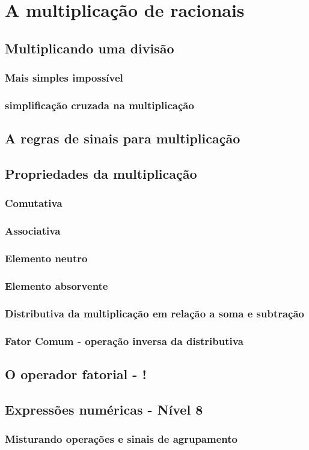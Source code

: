 \chapter[A multiplicação de racionais]{A multiplicação de racionais}

\section{Multiplicando uma divisão}

\subsection{Mais simples impossível}

\subsection{simplificação cruzada na multiplicação}

\section{A regras de sinais para multiplicação}

\section{Propriedades da multiplicação}

\subsection{Comutativa}

\subsection{Associativa}

\subsection{Elemento neutro}

\subsection{Elemento absorvente}

\subsection{Distributiva da multiplicação em relação a soma e subtração}

\subsection{Fator Comum - operação inversa da distributiva}

\section{O operador fatorial - !}

\section{Expressões numéricas - Nível 8}

\subsection{Misturando operações e sinais de agrupamento}

